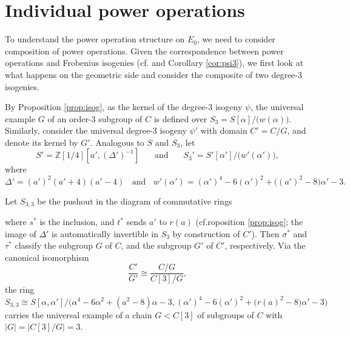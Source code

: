 \documentclass{gtpart}
\theoremstyle{definition}
\theoremstyle{remark}
\newcommand{\mb}[1]{\mathbb{#1}}
\newcommand{\cff}[2]{cf.\thinspace{\cite[#1]{#2}}}
\newcommand{\BZ}{{\mb Z}}
\newcommand{\A}{\alpha}
\newcommand{\s}{S_{3,3}}
\begin{document}
\section{Individual power operations}
\label{sec:Gamma}

To understand the power operation structure on $E_0$, 
we need to consider composition of power operations.  
Given the correspondence between power operations and Frobenius isogenies (\cff{Theorem B}{cong} and Corollary \ref{cor:psi3}), 
we first look at what happens on the geometric side and consider the composite of two degree-3 isogenies.  

By Proposition \ref{prop:isog}, as the kernel of the degree-3 isogeny $\psi$, 
the universal example $G$ of an order-3 subgroup of $C$ is defined over 
$S_3 = S[\A] \big/ \big( w(\A) \big)$.  
Similarly, consider the universal degree-3 isogeny $\psi'$ with domain 
$C' = C/G$, and denote its kernel by $G'$.  
Analogous to $S$ and $S_3$, let 
\begin{equation}
\label{w'}
 S' = \BZ [1/4] [a', (\Delta')^{-1}]~~~~~~~~\text{and}~~~~~~~~S_3' = S'[\A'] \big/ \big( w'(\A') \big), 
\end{equation}
where 
\[
 \Delta' = (a')^2 (a' + 4) (a' - 4)~~~~\text{and}~~~~w'(\A') = (\A')^4 - 6 (\A')^2 + \big( (a')^2 - 8 \big) \A' - 3.  
\]

Let $\s$ be the pushout in the diagram of commutative rings 
\begin{center}
\end{center}
where $s^*$ is the inclusion, and $t^*$ sends $a'$ to $r(a)$ (cf.roposition \ref{prop:isog}; 
the image of $\Delta'$ is automatically invertible in $S_3$ by construction of $C'$).  
Then $\sigma^*$ and $\tau^*$ classify the subgroup $G$ of $C$, and the subgroup $G'$ of $C'$, respectively.  
Via the canonical isomorphism 
\[
 \frac{C'}{G'} \cong \frac{C/G}{C[3]/G}, 
\]
the ring 
\[
 \s \cong S[\A,\A'] \Big/ \Big( \A^4 - 6 \A^2 + (a^2 - 8) \A - 3, (\A')^4 - 6 (\A')^2 + \big( r(a)^2 - 8 \big) \A' - 3 \Big) 
\]
carries the universal example of a chain $G < C[3]$ of subgroups of $C$ with $|G| = |C[3]/G| = 3$.  
\end{document}
